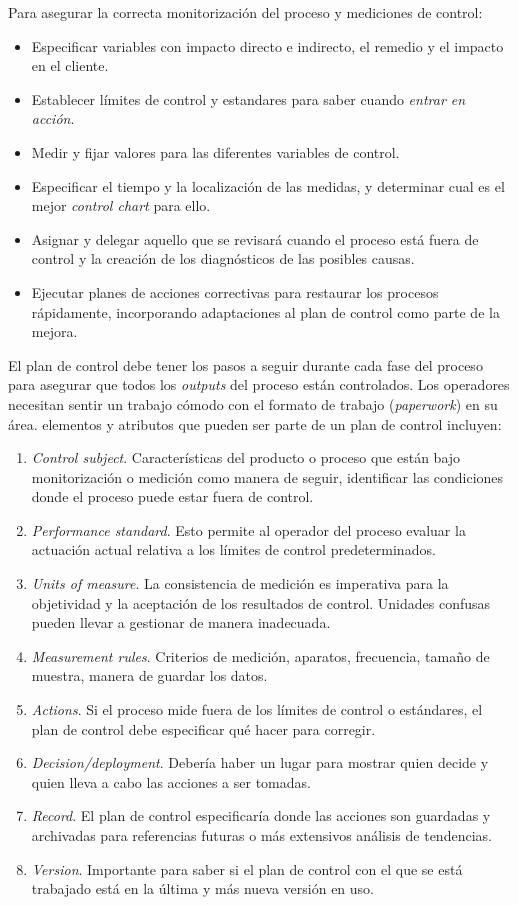 \documentclass[]{article}
\begin{document}
Para asegurar la correcta monitorización del proceso y mediciones de control:
\begin{itemize}
	\item Especificar variables con impacto directo e indirecto, el remedio y el impacto en el cliente.
	\item Establecer límites de control y estandares para saber cuando \textit{entrar en acción}.
	\item Medir y fijar valores para las diferentes variables de control.
	\item Especificar el tiempo y la localización de las medidas, y determinar cual es el mejor \textit{control chart} para ello.
	\item Asignar y delegar aquello que se revisará cuando el proceso está fuera de control y la creación de los diagnósticos de las posibles causas.
	\item Ejecutar planes de acciones correctivas para restaurar los procesos rápidamente, incorporando adaptaciones al plan de control como parte de la mejora.
\end{itemize}

El plan de control debe tener los pasos a seguir durante cada fase del proceso para asegurar que todos los \textit{outputs} del proceso están controlados. Los operadores necesitan sentir un trabajo cómodo con el formato de trabajo (\textit{paperwork}) en su área. elementos y atributos que pueden ser parte de un plan de control incluyen:
\begin{enumerate}
	\item \textit{Control subject}. Características del producto o proceso que están bajo monitorización o medición como manera de seguir, identificar las condiciones donde el proceso puede estar fuera de control.
	\item \textit{Performance standard}. Esto permite al operador del proceso evaluar la actuación actual relativa a los límites de control predeterminados.
	\item \textit{Units of measure}. La consistencia de medición es imperativa para la objetividad y la aceptación de los resultados de control. Unidades confusas pueden llevar a gestionar de manera inadecuada.
	\item \textit{Measurement rules}. Criterios de medición, aparatos, frecuencia, tamaño de muestra, manera de guardar los datos.
	\item \textit{Actions}. Si el proceso mide fuera de los límites de control o estándares, el plan de control debe especificar qué hacer para corregir.
	\item \textit{Decision/deployment}. Debería haber un lugar para mostrar quien decide y quien lleva a cabo las acciones a ser tomadas.
	\item \textit{Record}. El plan de control especificaría donde las acciones son guardadas y archivadas para referencias futuras o más extensivos análisis de tendencias.
	\item \textit{Version}. Importante para saber si el plan de control con el que se está trabajado está en la última y más nueva versión en uso.
\end{enumerate}
\end{document}
